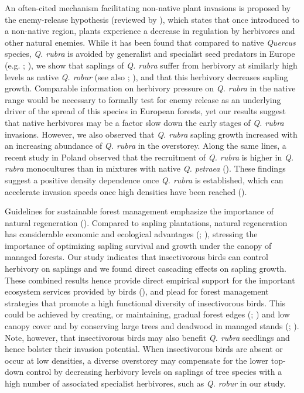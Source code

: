 \documentclass[b5paper,10pt]{book} %
\begin{document}
An often-cited mechanism facilitating non-native plant invasions is proposed by the enemy-release hypothesis (reviewed by \citealt{Liu2006}), which states that once introduced to a non-native region, plants experience a decrease in regulation by herbivores and other natural enemies. While it has been found that compared to native \textit{Quercus} species, \textit{Q. rubra} is avoided by generalist and specialist seed predators in Europe (e.g. \citealt{Myczko2014}; \citealt{Bogdziewicz2019}), we show that saplings of \textit{Q. rubra} suffer from herbivory at similarly high levels as native \textit{Q. robur} (see also \citealt{Wein2016}; \citealt{vanSchrojensteinLantman2018}), and that this herbivory decreases sapling growth. Comparable information on herbivory pressure on \textit{Q. rubra} in the native range would be necessary to formally test for enemy release as an underlying driver of the spread of this species in European forests, yet our results suggest that native herbivores may be a factor slow down the early stages of \textit{Q. rubra} invasions. However, we also observed that \textit{Q. rubra} sapling growth increased with an increasing abundance of \textit{Q. rubra} in the overstorey. Along the same lines, a recent study in Poland observed that the recruitment of \textit{Q. rubra} is higher in \textit{Q. rubra} monocultures than in mixtures with native \textit{Q. petraea} (\citealt{Bogdziewicz2019}). These findings suggest a positive density dependence once \textit{Q. rubra} is established, which can accelerate invasion speeds once high densities have been reached (\citealt{Brooker2008}). 

	Guidelines for sustainable forest management emphasize the importance of natural regeneration (\citealt{denOuden2010}). Compared to sapling plantations, natural regeneration has considerable economic and ecological advantages (\citealt{Burgi2003}; \citealt{Vranckx2014}), stressing the importance of optimizing sapling survival and growth under the canopy of managed forests. Our study indicates that insectivorous birds can control herbivory on saplings and we found direct cascading effects on sapling growth. These combined results hence provide direct empirical support for the important ecosystem services provided by birds (\citealt{Sekercioglu2012}), and plead for forest management strategies that promote a high functional diversity of insectivorous birds. This could be achieved by creating, or maintaining, gradual forest edges (\citealt{Terraube2016}; \citealt{Melin2018}) and low canopy cover and by conserving large trees and deadwood in managed stands (\citealt{Bereczki2014}; \citealt{Penone2018}). Note, however, that insectivorous birds may also benefit \textit{Q. rubra} seedlings and hence bolster their invasion potential. When insectivorous birds are absent or occur at low densities, a diverse overstorey may compensate for the lower top-down control by decreasing herbivory levels on saplings of tree species with a high number of associated specialist herbivores, such as \textit{Q. robur} in our study.
\end{document}

